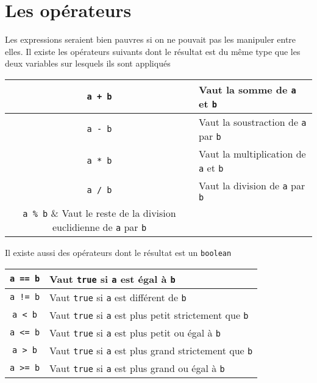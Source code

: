 \section{Les opérateurs}
Les expressions seraient bien pauvres si on ne pouvait pas les manipuler
entre elles.
Il existe les opérateurs suivants dont le résultat est du même type
que les deux variables sur lesquels ils sont appliqués
\begin{center}
  \begin{tabular}{|c|l|}
    \hline
    \lstinline|a + b| & Vaut la somme de \lstinline|a| et \lstinline|b|\\
    \hline
    \lstinline|a - b| & Vaut la soustraction de \lstinline|a| par \lstinline|b|\\
    \hline
    \lstinline|a * b| & Vaut la multiplication de \lstinline|a| et \lstinline|b|\\
    \hline
    \lstinline|a / b| & Vaut la division de \lstinline|a| par \lstinline|b|\\
    \hline
    \lstinline|a % b| & Vaut le reste de la division euclidienne
    de \lstinline|a| par \lstinline|b|\\
    \hline
  \end{tabular}
\end{center}
Il existe aussi des opérateurs dont le résultat est un \lstinline|boolean|
\begin{center}
  \begin{tabular}{|c|l|}
    \hline
    \lstinline|a == b| & Vaut \lstinline|true|
    si \lstinline|a| est égal à \lstinline|b|\\
    \hline
    \lstinline|a != b| & Vaut \lstinline|true|
    si \lstinline|a| est différent de \lstinline|b|\\
    \hline
    \lstinline|a < b| & Vaut \lstinline|true| si \lstinline|a| est plus petit
    strictement que \lstinline|b|\\
    \hline
    \lstinline|a <= b| & Vaut \lstinline|true| si \lstinline|a| est plus petit
    ou égal à \lstinline|b|\\
    \hline
    \lstinline|a > b| & Vaut \lstinline|true| si \lstinline|a| est plus grand
    strictement que \lstinline|b|\\
    \hline
    \lstinline|a >= b| & Vaut \lstinline|true| si \lstinline|a| est plus grand
    ou égal à \lstinline|b|\\
    \hline
  \end{tabular}
\end{center}

